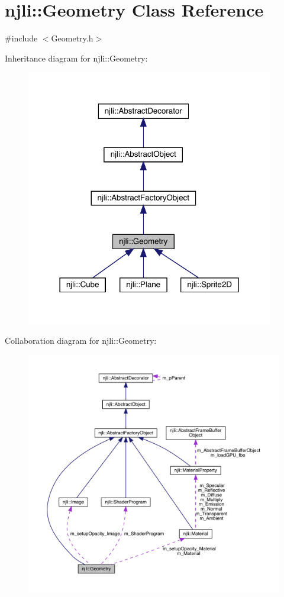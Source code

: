 \hypertarget{classnjli_1_1_geometry}{}\section{njli\+:\+:Geometry Class Reference}
\label{classnjli_1_1_geometry}


{\ttfamily \#include $<$Geometry.\+h$>$}



Inheritance diagram for njli\+:\+:Geometry\+:\nopagebreak
\begin{figure}[H]
\begin{center}
\leavevmode
\includegraphics[width=306pt]{classnjli_1_1_geometry__inherit__graph}
\end{center}
\end{figure}


Collaboration diagram for njli\+:\+:Geometry\+:\nopagebreak
\begin{figure}[H]
\begin{center}
\leavevmode
\includegraphics[width=350pt]{classnjli_1_1_geometry__coll__graph}
\end{center}
\end{figure}
